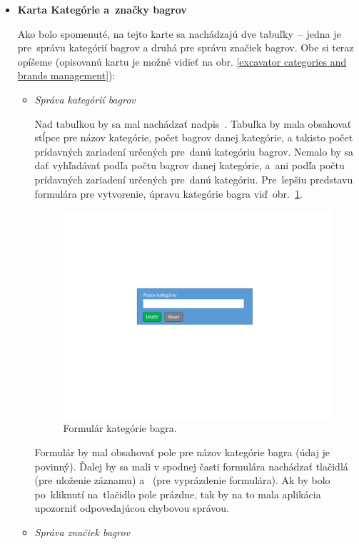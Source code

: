 \begin{itemize}
\item \textbf{Karta Kategórie a~značky bagrov}

Ako bolo spomenuté, na tejto karte sa nachádzajú dve tabuľky~-- jedna je pre~správu kategórií bagrov a druhá pre správu značiek bagrov. Obe si teraz opíšeme (opisovanú kartu je možné vidieť na obr. \ref{excavator categories and brands management}):

\begin{itemize}
\item \textit{Správa kategórií bagrov}

Nad tabuľkou by sa mal nachádzať nadpis~. Tabuľka by mala obsahovať stĺpce pre názov kategórie, počet bagrov danej kategórie, a takisto počet prídavných zariadení určených pre~danú kategóriu bagrov. Nemalo by sa dať vyhľadávať podľa počtu bagrov danej kategórie, a~ani podľa počtu prídavných zariadení určených pre~danú kategóriu. Pre~lepšiu predstavu formulára pre vytvorenie, úpravu kategórie bagra viď~obr.~\ref{excavator category form}.

\begin{figure}[H]\centering
\includegraphics[width=140mm]{../img/UI concept/excavator category form}
\caption{Formulár kategórie bagra.}
\label{excavator category form}
\end{figure}

Formulár by mal obsahovať pole pre názov kategórie bagra (údaj je povinný). Ďalej by sa mali v spodnej časti formulára nachádzať tlačidlá  (pre uloženie záznamu) a~ (pre vyprázdenie formulára). Ak by bolo po~kliknutí na~tlačidlo  pole prázdne, tak by na to mala aplikácia upozorniť odpovedajúcou chybovou správou.
\newpage
\item \textit{Správa značiek bagrov}


\end{itemize}
\end{itemize}
